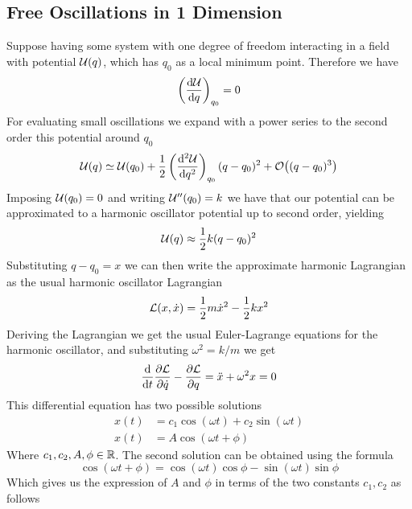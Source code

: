 \documentclass[../admech.tex]{subfiles}
\begin{document}
\subsection{Free Oscillations in 1 Dimension}
Suppose having some system with one degree of freedom interacting in a field with potential $\mathcal{U}(q)$, which has $q_0$ as a local minimum point. Therefore we have
\begin{equation}
	\left( \dv{\mathcal{U}}{q} \right)_{q_0}=0
	\label{eq:critpoint}
\end{equation}
For evaluating small oscillations we expand with a power series to the second order this potential around $q_0$
\begin{equation}
	\pot(q)\simeq\pot(q_0)+\frac{1}{2}\left( \dv[2]{\pot}{q} \right)_{q_0}(q-q_0)^2+\order{(q-q_0)^3}
	\label{eq:potapprox}
\end{equation}
Imposing $\mathcal{U}(q_0)=0$ and writing $\mathcal{U}''(q_0)=k$ we have that our potential can be approximated to a harmonic oscillator potential up to second order, yielding
\begin{equation}
	\mathcal{U}(q)\approx\frac{1}{2}k(q-q_0)^2
	\label{eq:approxharmpot}
\end{equation}
Substituting $q-q_0=x$ we can then write the approximate harmonic Lagrangian as the usual harmonic oscillator Lagrangian
\begin{equation}
	\mathcal{L}(x,\dot{x})=\frac{1}{2}m\dot{x}^2-\frac{1}{2}kx^2
	\label{eq:osclag1}
\end{equation}
Deriving the Lagrangian we get the usual Euler-Lagrange equations for the harmonic oscillator, and substituting $\omega^2=k/m$ we get
\begin{equation}
	\dv{t}\pdv{\mathcal{L}}{\dot{q}}-\pdv{\mathcal{L}}{q}=\ddot{x}+\omega^2x=0
	\label{eq:osceleq1}
\end{equation}
This differential equation has two possible solutions
\begin{equation}
	\begin{aligned}
		x(t)&=c_1\cos(\omega t)+c_2\sin(\omega t)\\
		x(t)&=A\cos(\omega t+\phi)
	\end{aligned}
	\label{eq:oscsol1}
\end{equation}
Where $c_1,c_2,A,\phi\in\operatorname{\mathbb{R}}$. The second solution can be obtained using the formula
\begin{equation*}
	\cos(\omega t+\phi)=\cos(\omega t)\cos\phi-\sin(\omega t)\sin\phi
\end{equation*}
Which gives us the expression of $A$ and $\phi$ in terms of the two constants $c_1,c_2$ as follows
\end{document}
